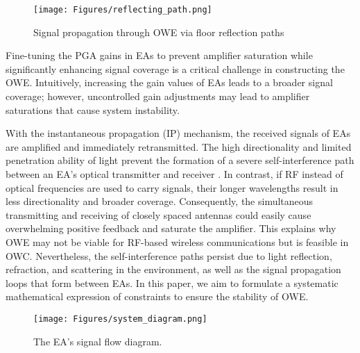 \begin{figure*}[htbp]
\centering
\texttt{[image: Figures/reflecting\_path.png]}
\caption{Signal propagation through OWE via floor reflection paths}
\label{reflecting_path}
\end{figure*}
\par
Fine-tuning the PGA gains in EAs to prevent amplifier saturation while significantly enhancing signal coverage is a critical challenge in constructing the OWE. Intuitively, increasing the gain values of EAs leads to a broader signal coverage; however, uncontrolled gain adjustments may lead to amplifier saturations that cause system instability.
\par
With the instantaneous propagation (IP) mechanism, the received signals of EAs are amplified and immediately retransmitted. The high directionality and limited penetration ability of light prevent the formation of a severe self-interference path between an EA's optical transmitter and receiver \cite{narmanlioglu2017cooperative, yang2013full, 10645235}. In contrast, if RF instead of optical frequencies are used to carry signals, their longer wavelengths result in less directionality and broader coverage. Consequently, the simultaneous transmitting and receiving of closely spaced antennas could easily cause overwhelming positive feedback and saturate the amplifier.
This explains why OWE may not be viable for RF-based wireless communications but is feasible in OWC.
Nevertheless, the self-interference paths persist due to light reflection, refraction, and scattering in the environment, as well as the signal propagation loops that form between EAs. In this paper, we aim to formulate a systematic mathematical expression of constraints to ensure the stability of OWE.

\begin{figure*}
\centering
\texttt{[image: Figures/system\_diagram.png]}
\caption{The EA's signal flow diagram.}
\label{system_diagram}
\vspace{-0.5cm}
\end{figure*}

